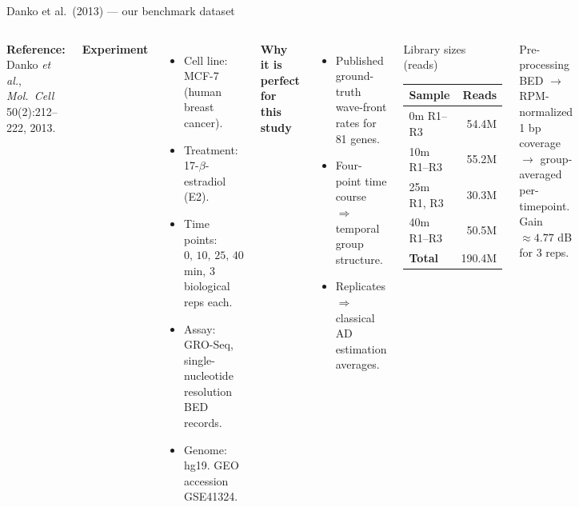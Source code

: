 \documentclass[aspectratio=169,10pt]{beamer}
\begin{document}
\begin{frame}{Danko et al.\ (2013) --- our benchmark dataset}
\begin{columns}[T,onlytextwidth]
\small
\textbf{Reference:} Danko \emph{et al.}, \emph{Mol.\ Cell} 50(2):212--222, 2013.

\medskip
\textbf{Experiment}
\begin{itemize}
  \item Cell line: MCF-7 (human breast cancer).
  \item Treatment: 17-$\beta$-estradiol (E2).
  \item Time points: $0,\,10,\,25,\,40$ min, 3 biological reps each.
  \item Assay: GRO-Seq, single-nucleotide resolution BED records.
  \item Genome: hg19. GEO accession GSE41324.
\end{itemize}

\textbf{Why it is perfect for this study}
\begin{itemize}
  \item Published \alert{ground-truth wave-front rates} for 81 genes.
  \item Four-point time course $\Rightarrow$ temporal group structure.
  \item Replicates $\Rightarrow$ classical AD estimation averages.
\end{itemize}

\begin{block}{Library sizes (reads)}
\scriptsize
\begin{tabular}{@{}lr@{}}
\toprule
Sample & Reads \\
\midrule
0m R1--R3  & 54.4M \\
10m R1--R3 & 55.2M \\
25m R1, R3 & 30.3M \\
40m R1--R3 & 50.5M \\
\midrule
\textbf{Total}  & 190.4M \\
\bottomrule
\end{tabular}
\end{block}
\begin{block}{Pre-processing}
\scriptsize
BED $\to$ RPM-normalized 1 bp coverage $\to$ group-averaged per-timepoint.
Gain $\approx 4.77$ dB for 3 reps.
\end{block}
\end{columns}
\end{frame}
\end{document}
